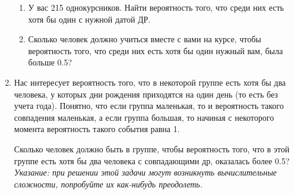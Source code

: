 \documentclass{article}
\begin{document}
\begin{enumerate}
    \begin{enumerate}
        \item У вас 215 однокурсников. Найти вероятность того, что среди них есть хотя бы один с нужной датой ДР.
        \item Сколько человек должно учиться вместе с вами на курсе, чтобы вероятность того, что среди них есть хотя бы один нужный вам, была больше 0.5?
    \end{enumerate}

    \item Нас интересует вероятность того, что в некоторой группе есть хотя бы два человека, у которых дни рождения приходятся на один день (то есть без учета года). Понятно, что если группа маленькая, то и вероятность такого совпадения маленькая, а если группа большая, то начиная с некоторого момента вероятность такого события равна 1.

    Сколько человек должно быть в группе, чтобы вероятность того, что в этой группе есть хотя бы два человека с совпадающими др, оказалась более 0.5?
    \textit{Указание: при решении этой задачи могут возникнуть вычислительные сложности, попробуйте их как-нибудь преодолеть.}
   
\end{enumerate}
\end{document}
